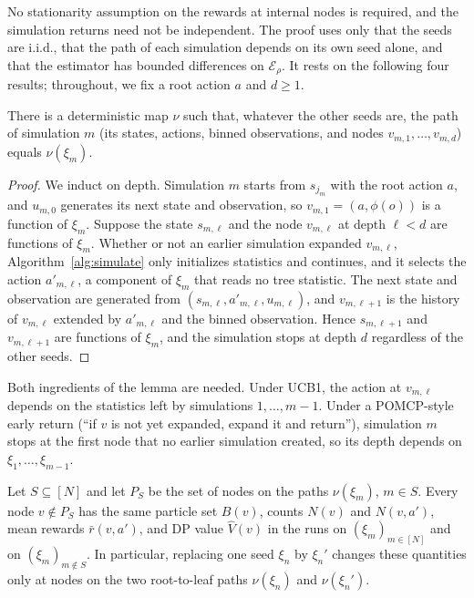 No stationarity assumption on the rewards at internal nodes is required, and the simulation returns need not be independent.
The proof uses only that the seeds are i.i.d., that the path of each simulation depends on its own seed alone, and that the estimator has bounded differences on $\mathcal E_\rho$.
It rests on the following four results; throughout, we fix a root action $a$ and $d\ge1$.

\begin{lem}\label{lem:path_decoupling}
There is a deterministic map $\nu$ such that, whatever the other seeds are, the path of simulation $m$ (its states, actions, binned observations, and nodes $v_{m,1},\ldots,v_{m,d}$) equals $\nu(\xi_m)$.
\end{lem}

\begin{proof}
We induct on depth.
Simulation $m$ starts from $s_{j_m}$ with the root action $a$, and $u_{m,0}$ generates its next state and observation, so $v_{m,1}=(a,\phi(o))$ is a function of $\xi_m$.
Suppose the state $s_{m,\ell}$ and the node $v_{m,\ell}$ at depth $\ell<d$ are functions of $\xi_m$.
Whether or not an earlier simulation expanded $v_{m,\ell}$, Algorithm~\ref{alg:simulate} only initializes statistics and continues, and it selects the action $a'_{m,\ell}$, a component of $\xi_m$ that reads no tree statistic.
The next state and observation are generated from $(s_{m,\ell},a'_{m,\ell},u_{m,\ell})$, and $v_{m,\ell+1}$ is the history of $v_{m,\ell}$ extended by $a'_{m,\ell}$ and the binned observation.
Hence $s_{m,\ell+1}$ and $v_{m,\ell+1}$ are functions of $\xi_m$, and the simulation stops at depth $d$ regardless of the other seeds.
\end{proof}

Both ingredients of the lemma are needed.
Under UCB1, the action at $v_{m,\ell}$ depends on the statistics left by simulations $1,\ldots,m-1$.
Under a POMCP-style early return (``if $v$ is not yet expanded, expand it and return''), simulation $m$ stops at the first node that no earlier simulation created, so its depth depends on $\xi_1,\ldots,\xi_{m-1}$.

\begin{cor}\label{cor:two_paths}
Let $S\subseteq[N]$ and let $P_S$ be the set of nodes on the paths $\nu(\xi_m)$, $m\in S$.
Every node $v\notin P_S$ has the same particle set $B(v)$, counts $N(v)$ and $N(v,a')$, mean rewards $\bar r(v,a')$, and DP value $\hat V(v)$ in the runs on $(\xi_m)_{m\in[N]}$ and on $(\xi_m)_{m\notin S}$.
In particular, replacing one seed $\xi_n$ by $\xi_n'$ changes these quantities only at nodes on the two root-to-leaf paths $\nu(\xi_n)$ and $\nu(\xi_n')$.
\end{cor}

